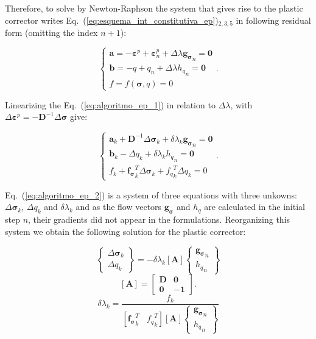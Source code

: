 \documentclass[Journal,letterpaper]{ascelike-new}
\newcommand{\All}{\boldsymbol A}
\newcommand{\al}{\boldsymbol a}
\newcommand{\bl}{\boldsymbol b}
\newcommand{\Dsdee}{\boldsymbol{D}}
\newcommand{\dfds}{\boldsymbol{f_\sigma}}
\newcommand{\hl}{{h_q}}
\newcommand{\dfdq}{{f_q}}
\newcommand{\strainp}{\boldsymbol{\varepsilon}^{p}}
\newcommand{\zerol}{\boldsymbol 0}
\newcommand{\onell}{\boldsymbol{1}}
\newcommand{\dgds}{\boldsymbol{g_\sigma}}
\newcommand{\stress}{\boldsymbol{\sigma}}
\begin{document}
Therefore, to solve by Newton-Raphson the system that gives rise to the plastic corrector writes Eq.~(\ref{eq:esquema_int_constitutiva_ep})$_{2,3,5}$ in following residual form (omitting the index $n+1$):

\begin{equation}
	\label{eq:algoritmo_ep_1}
	\left\{
	\begin{array}{lcl}
		\al = -\strainp + \strainp_n + \Delta \lambda \dgds_n = \zerol	\\
		\bl = -q + q_n + \Delta\lambda\hl_n = \zerol \\
		f = f(\stress,q) = 0
	\end{array}
	\right..
\end{equation}

Linearizing the Eq.~(\ref{eq:algoritmo_ep_1}) in relation to $\Delta \lambda$, with $\Delta \strainp = - \Dsdee^{-1}\Delta\stress$ give:

\begin{equation}
	\label{eq:algoritmo_ep_2}
	\left\{
	\begin{array}{lcl}
		\al_k + \Dsdee^{-1}\Delta\stress_k + \delta \lambda_k \dgds_n = \zerol \\
		\bl_k - \Delta q_k + \delta \lambda_k \hl_n = \zerol \\
		f_k + \dfds_k^T\Delta\stress_k + \dfdq_k^T \Delta q_k = 0
	\end{array}
	\right..
\end{equation}

Eq.~(\ref{eq:algoritmo_ep_2}) is a system of three equations with three unkowns: $\Delta \stress_k$, $\Delta q_k$ and $\delta \lambda_k$ and as the flow vectors $\dgds$ and $\hl$ are calculated in the initial step $n$, their gradients did not appear in the formulations. Reorganizing this system we obtain the following solution for the plastic corrector:

\begin{equation}
	\label{eq:algoritmo_ep_3}
	\left\{
	\begin{array}{lcl}
		\Delta \stress_k \\
		\Delta q_k
	\end{array}
	\right\} = -\delta\lambda_k \left[ \All \right]
	\left\{	
	\begin{array}{lcl}
		\dgds_n \\
		\hl_n
	\end{array}
	\right\}
\end{equation}
\begin{equation}
	\label{eq:Ak}
	\left[ \All \right] =
	\begin{bmatrix}
		\Dsdee & \zerol \\
		\zerol & -\onell
	\end{bmatrix}.
\end{equation}
\begin{equation}
	\label{eq:deltalambdak}
	\delta \lambda_k = \dfrac{f_k}{\left[\dfds_k^T~~~~\dfdq_k^T\right]\left[\All \right]\left\{ 
		\begin{array}{lcl}
			\dgds_n \\ 
			\hl_n
		\end{array}\right\}}
\end{equation}
\end{document}

